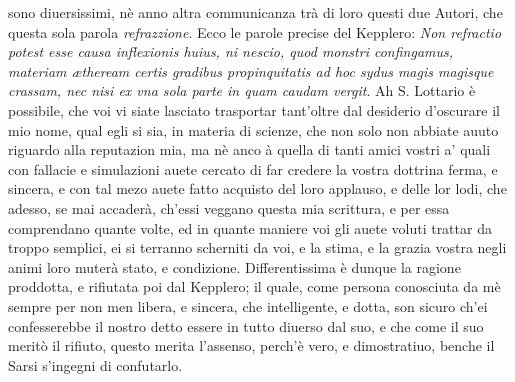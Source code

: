 \documentclass[11pt,twoside,openany]{book}
\begin{document}
sono diuersissimi, nè anno altra communicanza trà di loro questi due Autori, che questa sola parola \textit{refrazzione}. Ecco le parole precise del Kepplero: \textit{Non refractio potest esse causa inflexionis huius, ni nescio, quod monstri confingamus, materiam ætheream certis gradibus propinquitatis ad hoc sydus magis magisque crassam, nec nisi ex vna sola parte in quam caudam vergit}. Ah S. Lottario è possibile, che voi vi siate lasciato trasportar tant'oltre dal desiderio d'oscurare il mio nome, qual egli si sia, in materia di scienze, che non solo non abbiate auuto riguardo alla reputazion mia, ma nè anco à quella di tanti amici vostri a' quali con fallacie e simulazioni auete cercato di far credere la vostra dottrina ferma, e sincera, e con tal mezo auete fatto acquisto del loro applauso, e delle lor lodi, che adesso, se mai accaderà, ch'essi veggano questa mia scrittura, e per essa comprendano quante volte, ed in quante maniere voi gli auete voluti trattar da troppo semplici, ei si terranno scherniti da voi, e la stima, e la grazia vostra negli animi loro muterà stato, e condizione. Differentissima è dunque la ragione proddotta, e rifiutata poi dal Kepplero; il quale, come persona conosciuta da mè sempre per non men libera, e sincera, che intelligente, e dotta, son sicuro ch'ei confesserebbe il nostro detto essere in tutto diuerso dal suo, e che come il suo meritò il rifiuto, questo merita l'assenso, perch'è vero, e dimostratiuo, benche il Sarsi s'ingegni di confutarlo.
\end{document}
